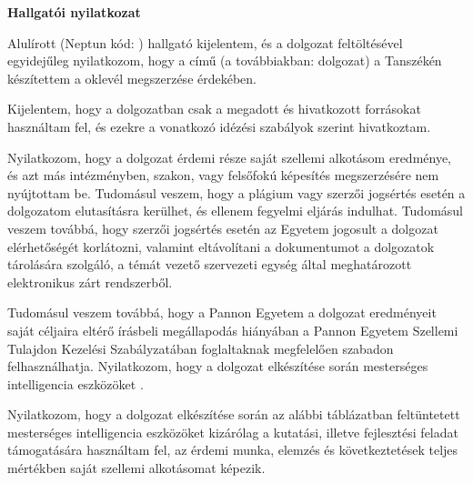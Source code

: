 \begin{center}
\textbf{\large{Hallgatói nyilatkozat}}\\[32pt]
\end{center}

\thispagestyle{fancy}
\pagestyle{fancy}
Alulírott \mynev (Neptun kód: \myneptun ) hallgató kijelentem, és a dolgozat feltöltésével egyidejűleg nyilatkozom, hogy a \mycim című \mydolgozategy  (a továbbiakban: dolgozat) a \myuni \mytanszek Tanszékén készítettem a \myvegzettseg oklevél megszerzése érdekében.\par

Kijelentem, hogy a dolgozatban csak a megadott és hivatkozott forrásokat használtam fel, és ezekre a vonatkozó idézési szabályok szerint hivatkoztam.
\vspace{0.6cm}\par

Nyilatkozom, hogy a dolgozat érdemi része saját szellemi alkotásom eredménye, és azt más intézményben, szakon, vagy felsőfokú képesítés megszerzésére nem nyújtottam be. Tudomásul veszem, hogy a plágium vagy szerzői jogsértés esetén a dolgozatom elutasításra kerülhet, és ellenem fegyelmi eljárás indulhat. Tudomásul veszem továbbá, hogy szerzői jogsértés esetén az Egyetem jogosult a dolgozat elérhetőségét korlátozni, valamint eltávolítani a dokumentumot a dolgozatok tárolására szolgáló, a témát vezető szervezeti egység által meghatározott elektronikus zárt rendszerből.
\vspace{0.6cm}\par

Tudomásul veszem továbbá, hogy a Pannon Egyetem a dolgozat eredményeit saját céljaira eltérő írásbeli megállapodás hiányában a Pannon Egyetem Szellemi Tulajdon Kezelési Szabályzatában foglaltaknak megfelelően szabadon felhasználhatja. 
Nyilatkozom, hogy a dolgozat elkészítése során mesterséges intelligencia eszközöket \myMIstatement. 
\vspace{0.6cm}\par


Nyilatkozom, hogy a dolgozat elkészítése során az alábbi táblázatban feltüntetett mesterséges intelligencia eszközöket kizárólag a kutatási, illetve fejlesztési feladat támogatására használtam fel, az érdemi munka, elemzés és következtetések teljes mértékben saját szellemi alkotásomat képezik.\\

